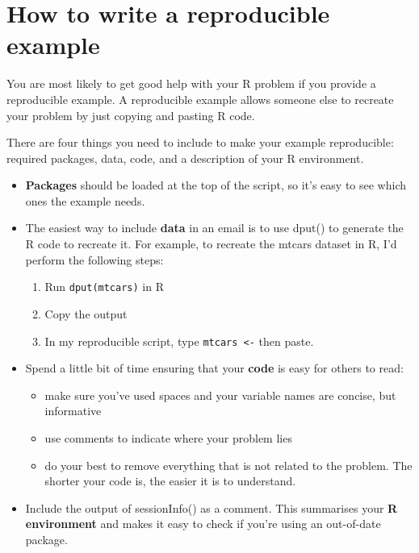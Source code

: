 \hypertarget{how-to-write-a-reproducible-example}{%
\chapter{How to write a reproducible
example}\label{how-to-write-a-reproducible-example}}

You are most likely to get good help with your R problem if you provide
a reproducible example. A reproducible example allows someone else to
recreate your problem by just copying and pasting R code.

There are four things you need to include to make your example
reproducible: required packages, data, code, and a description of your R
environment.

\begin{itemize}
\item
  \textbf{Packages} should be loaded at the top of the script, so it's
  easy to see which ones the example needs.
\item
  The easiest way to include \textbf{data} in an email is to use dput()
  to generate the R code to recreate it. For example, to recreate the
  mtcars dataset in R, I'd perform the following steps:

  \begin{enumerate}
  \def\labelenumi{\arabic{enumi}.}
  \tightlist
  \item
    Run \texttt{dput(mtcars)} in R
  \item
    Copy the output
  \item
    In my reproducible script, type \texttt{mtcars\ \textless{}-} then
    paste.
  \end{enumerate}
\item
  Spend a little bit of time ensuring that your \textbf{code} is easy
  for others to read:

  \begin{itemize}
  \item
    make sure you've used spaces and your variable names are concise,
    but informative
  \item
    use comments to indicate where your problem lies
  \item
    do your best to remove everything that is not related to the
    problem. The shorter your code is, the easier it is to understand.
  \end{itemize}
\item
  Include the output of sessionInfo() as a comment. This summarises your
  \textbf{R environment} and makes it easy to check if you're using an
  out-of-date package.
\end{itemize}

